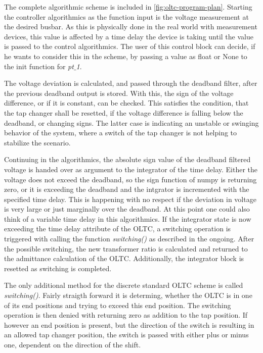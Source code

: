 The complete algorithmic scheme is included in \autoref{fig:oltc-program-plan}.
Starting the controller algorithmics as the function input is the voltage measurement at the desired busbar.
As this is physically done in the real world with measurement devices, this value is affected by a time delay the device is taking until the value is passed to the control algorithmics.
The user of this control block can decide, if he wants to consider this in the scheme, by passing a value as float or None to the init function for \textit{pt$\_$1}.

The voltage deviation is calculated, and passed through the deadband filter, after the previous deadband output is stored.
With this, the sign of the voltage difference, or if it is constant, can be checked.
This satisfies the condition, that the tap changer shall be resetted, if the voltage difference is falling below the deadband, or changing signs.
The latter case is indicating an unstable or swinging behavior of the system, where a switch of the tap changer is not helping to stabilize the scenario.

Continuing in the algorithmics, the absolute sign value of the deadband filtered voltage is handed over as argument to the integrator of the time delay.
Either the voltage does not exceed the deadband, so the sign function of numpy is returning zero, or it is exceeding the deadband and the intgrator is incremented with the specified time delay. 
This is happening with no respect if the deviation in voltage is very large or just marginally over the deadband.
At this point one could also think of a variable time delay in this algorithmics.
If the integrator state is now exceeding the time delay attribute of the \acs{OLTC}, a switching operation is triggered with calling the function \textit{switching()} as described in the ongoing.
After the possible switching, the new transformer ratio is calculated and returned to the admittance calculation of the \acs{OLTC}.
Additionally, the integrator block is resetted as switching is completed.

The only additional method for the discrete standard \acs{OLTC} scheme is called \textit{switching()}.
Fairly straigth forward it is determing, whether the \acs{OLTC} is in one of its end positions and trying to exceed this end position.
The switching operation is then denied with returning zero as addition to the tap position.
If however an end position is present, but the direction of the switch is resulting in an allowed tap changer position, the switch is passed with either plus or minus one, dependent on the direction of the shift.


